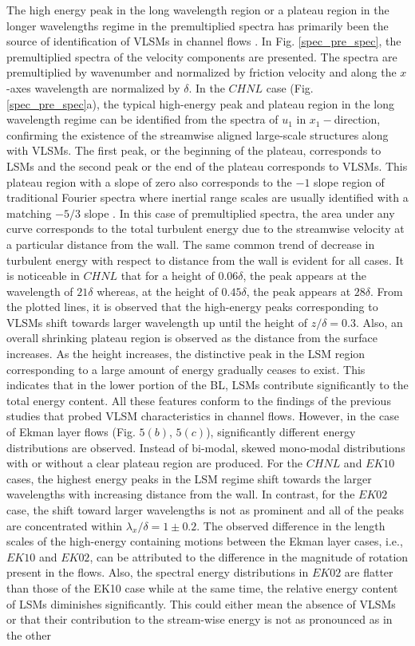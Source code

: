 The high energy peak in the  long wavelength region or a plateau region in the longer wavelengths regime in the premultiplied spectra has primarily been the source of identification of VLSMs in channel flows \citep{guala_adrian_jfm2006, fang2015blm}. In Fig. \ref{spec_pre_spec}, the premultiplied spectra of the velocity components are presented. The spectra are premultiplied by wavenumber and normalized by friction velocity and along the $x$-axes wavelength are normalized by $\delta$.  In the $CHNL$ case (Fig. \ref{spec_pre_spec}a), the typical high-energy peak and plateau region in the long wavelength regime can be identified from the spectra of $u_1$ in $x_1-$direction, confirming the existence of the streamwise aligned large-scale structures along with VLSMs. The first peak, or the beginning of the plateau, corresponds to LSMs and the second peak or the end of the plateau corresponds to VLSMs. This plateau region with a slope of zero also corresponds to the $-1$ slope region of traditional Fourier spectra where inertial range scales are usually identified with a matching $-5/3$ slope \citep{perry_chng_jfm_86,saddoughi1994}. In this case of premultiplied spectra, the area under any curve corresponds to the total turbulent energy due to the streamwise velocity at a particular distance from the wall. The same common trend of decrease in turbulent energy with respect to distance from the wall is evident for all cases. It is noticeable in $CHNL$  that for a height of $0.06\delta$, the peak appears at the wavelength of $21\delta$ whereas, at the height of $0.45\delta$, the peak appears at $28\delta$. From the plotted lines, it is observed that the high-energy peaks corresponding to VLSMs shift towards larger wavelength up until the height of $z/\delta = 0.3$. Also, an overall shrinking plateau region is observed as the distance from the surface increases. As the height increases, the distinctive peak in the LSM region corresponding to a large amount of energy gradually ceases to exist. This indicates that in the lower portion of the BL, LSMs contribute significantly to the total energy content. All these features conform to the findings of the previous studies that probed  VLSM characteristics in channel flows. However, in the case of Ekman layer flows (Fig. $5(b)$, $5(c)$), significantly  different energy distributions are observed. Instead of bi-modal, skewed mono-modal distributions with or without a clear plateau region are produced. For the $CHNL$ and $EK10$ cases, the highest energy peaks in the LSM regime shift towards the larger wavelengths with increasing distance from the wall. In contrast, for the $EK02$ case, the shift toward  larger wavelengths is not as prominent and all of the peaks are concentrated within $\lambda_x/\delta=1 \pm 0.2$. The observed difference in the length scales of the high-energy containing motions between the Ekman layer cases, i.e., $EK10$ and $EK02$, can be attributed to the difference in the magnitude of rotation present in the flows. Also, the spectral energy distributions in $EK02$  are flatter than those of the EK10 case while at the same time, the relative energy content of LSMs diminishes significantly. This could either mean the absence of VLSMs or that their contribution to the stream-wise energy is not as pronounced as in the other 